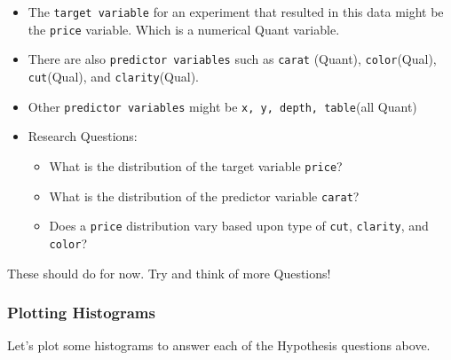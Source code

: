 \documentclass[
  letterpaper,
  DIV=11,
  numbers=noendperiod,
  oneside]{scrartcl}
\providecommand{\tightlist}{%
  \setlength{\itemsep}{0pt}\setlength{\parskip}{0pt}}
\begin{document}
\begin{tcolorbox}[enhanced jigsaw, title=\textcolor{quarto-callout-note-color}{\faInfo}\hspace{0.5em}{Hypothesis and Research Questions}, coltitle=black, colbacktitle=quarto-callout-note-color!10!white, colframe=quarto-callout-note-color-frame, breakable, arc=.35mm, opacityback=0, left=2mm, toptitle=1mm, toprule=.15mm, opacitybacktitle=0.6, bottomtitle=1mm, rightrule=.15mm, titlerule=0mm, bottomrule=.15mm, leftrule=.75mm, colback=white]

\begin{itemize}
\tightlist
\item
  The \texttt{target\ variable} for an experiment that resulted in this
  data might be the \texttt{price} variable. Which is a numerical Quant
  variable.\\
\item
  There are also \texttt{predictor\ variables} such as \texttt{carat}
  (Quant), \texttt{color}(Qual), \texttt{cut}(Qual), and
  \texttt{clarity}(Qual).\\
\item
  Other \texttt{predictor\ variables} might be
  \texttt{x,\ y,\ depth,\ table}(all Quant)\\
\item
  Research Questions:

  \begin{itemize}
  \tightlist
  \item
    What is the distribution of the target variable \texttt{price}?
  \item
    What is the distribution of the predictor variable \texttt{carat}?
  \item
    Does a \texttt{price} distribution vary based upon type of
    \texttt{cut}, \texttt{clarity}, and \texttt{color}?
  \end{itemize}
\end{itemize}

These should do for now. Try and think of more Questions!

\end{tcolorbox}

\subsubsection{\texorpdfstring{ Plotting
Histograms}{ Plotting Histograms}}\label{plotting-histograms}

Let's plot some histograms to answer each of the Hypothesis questions
above.
\end{document}
